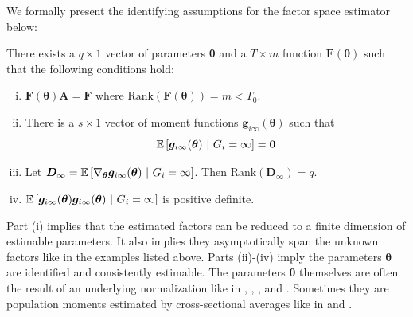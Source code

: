 \documentclass[12pt]{article}
\begin{document}
We formally present the identifying assumptions for the factor space estimator below:
\begin{assumption}\label{asm:factor_identification}
  There exists a $q \times 1$ vector of parameters $\bm \theta$ and a $T \times m$ function $\bm F(\bm \theta)$ such that the following conditions hold:
  \begin{enumerate}[(i)]
    \item $\bm F(\bm \theta) \bm A = \bm F$ where $\text{Rank}(\bm F(\bm \theta)) = m < T_0$.
    \item There is a $s \times 1$ vector of moment functions $\bm g_{i\infty}(\bm \theta)$ such that 
    \begin{equation}\label{eq:factor_moments}
      \mathbb{E}\left[\bm g_{i\infty}(\bm \theta) \ \vert \ G_i = \infty\right] = \bm 0
    \end{equation}
    
    \item Let $\bm D_{\infty} = \mathbb{E}\left[\nabla_{\bm \theta} \bm g_{i \infty}(\bm \theta) \ \vert \ G_i = \infty\right]$. Then $\text{Rank}(\bm D_{\infty}) = q$.
    \item $\mathbb{E}\left[\bm g_{i \infty}(\bm \theta) \bm g_{i \infty}(\bm \theta) \ \vert \ G_i = \infty\right]$ is positive definite. 
  \end{enumerate}
\end{assumption}
Part (i) implies that the estimated factors can be reduced to a finite dimension of estimable parameters. It also implies they asymptotically span the unknown factors like in the examples listed above. Parts (ii)-(iv) imply the parameters $\bm \theta$ are identified and consistently estimable. The parameters $\bm \theta$ themselves are often the result of an underlying normalization like in \citet{Bai_2009}, \citet{Ahn_Lee_Schmidt_2013}, \citet{Juodis_Sarafidis_2020}, and \citet{Callaway_Karami_2020}. Sometimes they are population moments estimated by cross-sectional averages like in \citet{Westerlund_Petrova_Norkute_2019} and \citet{Brown_Schmidt_Wooldridge2021}. 
\end{document}
